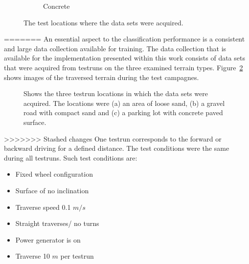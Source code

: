 \documentclass{article}
\begin{document}
\begin{figure}[!htb]
\begin{subfigure}[t]{0.32\textwidth}
        \caption{Concrete}
    \end{subfigure}
 \caption{The test locations where the data sets were acquired.}
 \label{fig:TestLocs}
\end{figure}


 
=======
An essential aspect to the classification performance is a consistent and large data collection available for training. The data collection that is available for the implementation presented within this work
consists of data sets that were acquired from testruns on the three examined terrain types. Figure~\ref{fig:TestLocs} shows images of the traversed terrain during the test campagnes.

\begin{figure}[!htb]
  \centering
  \qquad
  \qquad
  \caption{Shows the three testrun locations in which the data sets were acquired. The locations were (a) an area of loose sand, (b) a gravel road with compact sand and (c) a parking lot with concrete paved surface. \label{fig:TestLocs}}%
\end{figure}

>>>>>>> Stashed changes
One testrun corresponds to the forward or backward driving for a defined distance. The test conditions were the same during all testruns. Such test conditions are:
\begin{itemize}
\item Fixed wheel configuration
\item Surface of no inclination
\item Traverse speed 0.1 $m/s$
\item Straight traverses/ no turns
\item Power generator is on
\item Traverse 10 $m$ per testrun
\end{itemize}
\end{document}

